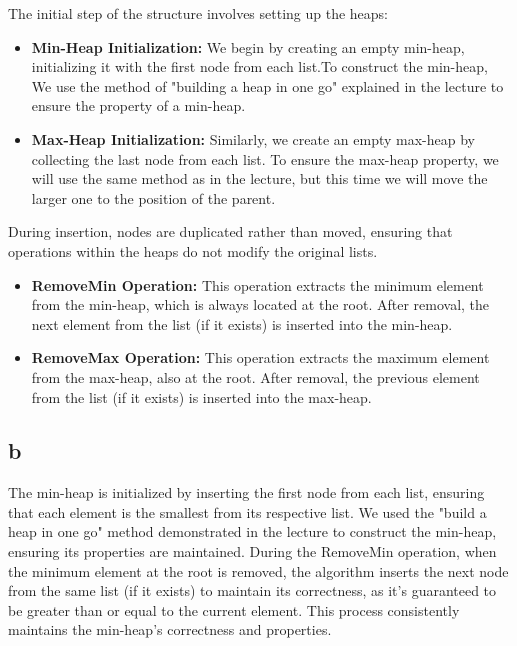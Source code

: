 \documentclass[12pt]{article}
\begin{document}
    The initial step of the structure involves setting up the heaps:
    \begin{itemize}
        \item \textbf{Min-Heap Initialization:} We begin by creating an empty min-heap, initializing it with the first node from each list.To construct the min-heap, We use the method of "building a heap in one go" explained in the lecture to ensure the property of a min-heap.

        \item \textbf{Max-Heap Initialization:} Similarly, we create an empty max-heap by collecting the last node from each list. To ensure the max-heap property, we will use the same method as in the lecture, but this time we will move the larger one to the position of the parent.
    \end{itemize}

    During insertion, nodes are duplicated rather than moved, ensuring that operations within the heaps do not modify the original lists. 

    \begin{itemize}
        \item \textbf{RemoveMin Operation:} This operation extracts the minimum element from the min-heap, which is always located at the root. After removal, the next element from the list (if it exists) is inserted into the min-heap.

        \item \textbf{RemoveMax Operation:}  This operation extracts the maximum element from the max-heap, also at the root. After removal, the previous element from the list (if it exists) is inserted into the max-heap.
    \end{itemize}


    \subsection*{b}

        \hspace{5mm}The min-heap is initialized by inserting the first node from each list, ensuring that each element is the smallest from its respective list. We used the "build a heap in one go" method demonstrated in the lecture to construct the min-heap, ensuring its properties are maintained. During the RemoveMin operation, when the minimum element at the root is removed, the algorithm inserts the next node from the same list (if it exists) to maintain its correctness, as it's guaranteed to be greater than or equal to the current element. This process consistently maintains the min-heap's correctness and properties.
\end{document}
